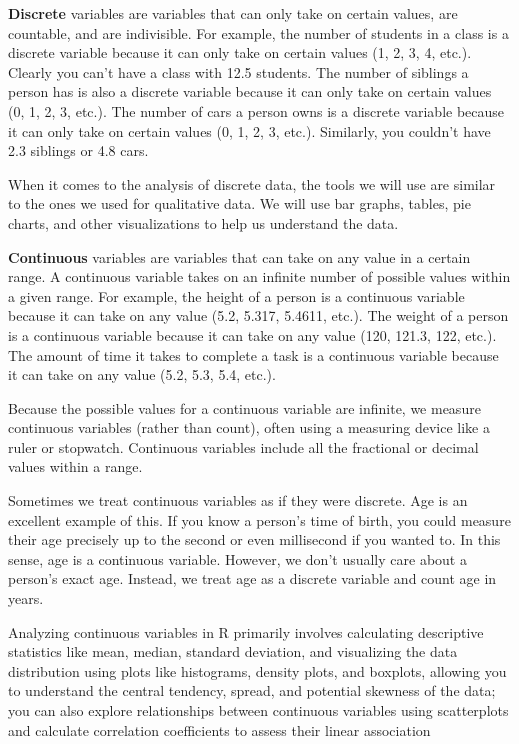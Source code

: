 \documentclass[
  letterpaper,
  DIV=11,
  numbers=noendperiod]{scrreprt}
\begin{document}
\textbf{Discrete} variables are variables that can only take on certain
values, are countable, and are indivisible. For example, the number of
students in a class is a discrete variable because it can only take on
certain values (1, 2, 3, 4, etc.). Clearly you can't have a class with
12.5 students. The number of siblings a person has is also a discrete
variable because it can only take on certain values (0, 1, 2, 3, etc.).
The number of cars a person owns is a discrete variable because it can
only take on certain values (0, 1, 2, 3, etc.). Similarly, you couldn't
have 2.3 siblings or 4.8 cars.

When it comes to the analysis of discrete data, the tools we will use
are similar to the ones we used for qualitative data. We will use bar
graphs, tables, pie charts, and other visualizations to help us
understand the data.

\textbf{Continuous} variables are variables that can take on any value
in a certain range. A continuous variable takes on an infinite number of
possible values within a given range. For example, the height of a
person is a continuous variable because it can take on any value (5.2,
5.317, 5.4611, etc.). The weight of a person is a continuous variable
because it can take on any value (120, 121.3, 122, etc.). The amount of
time it takes to complete a task is a continuous variable because it can
take on any value (5.2, 5.3, 5.4, etc.).

Because the possible values for a continuous variable are infinite, we
measure continuous variables (rather than count), often using a
measuring device like a ruler or stopwatch. Continuous variables include
all the fractional or decimal values within a range.

Sometimes we treat continuous variables as if they were discrete. Age is
an excellent example of this. If you know a person's time of birth, you
could measure their age precisely up to the second or even millisecond
if you wanted to. In this sense, age is a continuous variable. However,
we don't usually care about a person's exact age. Instead, we treat age
as a discrete variable and count age in years.

Analyzing continuous variables in R primarily involves calculating
descriptive statistics like mean, median, standard deviation, and
visualizing the data distribution using plots like histograms, density
plots, and boxplots, allowing you to understand the central tendency,
spread, and potential skewness of the data; you can also explore
relationships between continuous variables using scatterplots and
calculate correlation coefficients to assess their linear association
\end{document}
